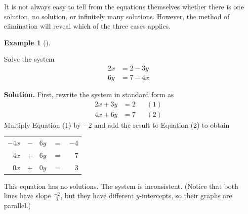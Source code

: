 \documentclass[10pt,]{book}
\theoremstyle{plain}
\theoremstyle{definition}
\theoremstyle{definition}
\newtheorem{example}[theorem]{Example}
\theoremstyle{definition}
\theoremstyle{definition}
\numberwithin{equation}{section}
\newcommand{\hrulethin}  {\noalign{\hrule height 0.04em}}
\newcommand{\amp}{ & }
\begin{document}
	It is not always easy to tell from the equations themselves whether there is one solution, no solution, or infinitely many solutions. However, the method of elimination will reveal which of the three cases applies.
%
\begin{example}[]\label{example-inconsistent-system2}

		Solve the system
		\begin{align*}

				2x \amp= 2 − 3y
			\\

				6y \amp= 7 − 4x
			
\end{align*}
\par\medskip\noindent%
\textbf{Solution.}\quad 
		First, rewrite the system in standard form as
		\begin{align*}

				2x + 3y \amp = 2 \amp\amp (1)
			\\

				4x + 6y \amp = 7 \amp\amp (2)
			
\end{align*}
		Multiply Equation (1) by \(-2\) and add the result to Equation (2) to obtain
		\leavevmode%
\begin{table}
\centering
\begin{tabular}{rrrrr}
\(-4x\)&\(-\)&\(6y\)&\(=\)&\(-4\)\tabularnewline[0pt]
\(4x\)&\(+\)&\(6y\)&\(=\)&\(7\)\tabularnewline\hrulethin
\(0x\)&\(+\)&\(0y\)&\(=\)&\(3\)
\end{tabular}
\end{table}

		This equation has no solutions. The system is inconsistent. (Notice that both lines have slope \(\frac{-2}{3}\), but they have different \(y\)-intercepts, so their graphs are parallel.)
\end{example}
\par
\end{document}
